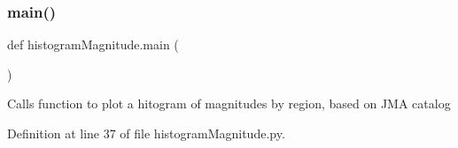 \mbox{\label{namespacehistogram_magnitude_aba686c56649e979a73ebcd750aeebdd4}} 
\subsubsection{\texorpdfstring{main()}{main()}}
{\footnotesize\ttfamily def histogram\+Magnitude.\+main (\begin{DoxyParamCaption}{ }\end{DoxyParamCaption})}

\begin{DoxyVerb}Calls function to plot a hitogram of magnitudes by region, based on JMA catalog
\end{DoxyVerb}
 

Definition at line 37 of file histogram\+Magnitude.\+py.

